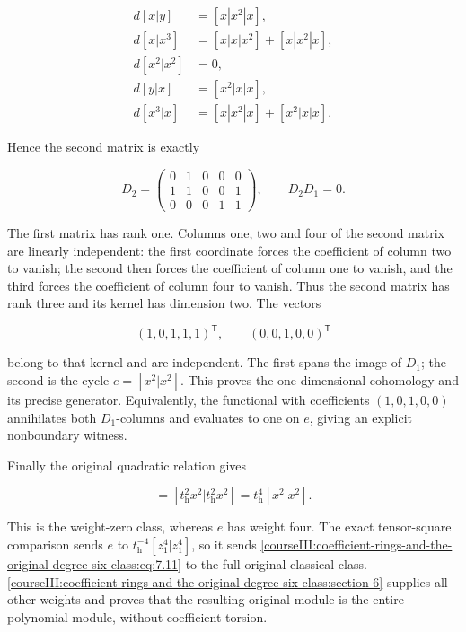 \begin{equation}
\begin{aligned}
 d[x|y]&=[x|x^2|x],\\
 d[x|x^3]&=[x|x|x^2]+[x|x^2|x],\\
 d[x^2|x^2]&=0,\\
 d[y|x]&=[x^2|x|x],\\
 d[x^3|x]&=[x|x^2|x]+[x^2|x|x].
 \end{aligned}
 \label{courseIII:coefficient-rings-and-the-original-degree-six-class:eq:7.8}
\end{equation}

Hence the second matrix is exactly

\begin{equation}
D_2=
 \begin{pmatrix}
 0&1&0&0&0\\
 1&1&0&0&1\\
 0&0&0&1&1
 \end{pmatrix},
 \qquad D_2D_1=0.
 \label{courseIII:coefficient-rings-and-the-original-degree-six-class:eq:7.9}
\end{equation}

The first matrix has rank one. Columns one, two and four of the second matrix are linearly independent: the first coordinate forces the coefficient of column two to vanish; the second then forces the coefficient of column one to vanish, and the third forces the coefficient of column four to vanish. Thus the second matrix has rank three and its kernel has dimension two. The vectors

\begin{equation}
(1,0,1,1,1)^{\mathsf T},
 \qquad
 (0,0,1,0,0)^{\mathsf T}
 \label{courseIII:coefficient-rings-and-the-original-degree-six-class:eq:7.10}
\end{equation}

belong to that kernel and are independent. The first spans the image of \(D_1\); the second is the cycle \(e=[x^2|x^2]\). This proves the one-dimensional cohomology and its precise generator. Equivalently, the functional with coefficients \((1,0,1,0,0)\) annihilates both \(D_1\)-columns and evaluates to one on \(e\), giving an explicit nonboundary witness.

Finally the original quadratic relation gives

\begin{equation}
[\tau_0^4|\tau_0^4]
       =[t_{\mathrm h}^2x^2|t_{\mathrm h}^2x^2]
       =t_{\mathrm h}^4[x^2|x^2].
 \label{courseIII:coefficient-rings-and-the-original-degree-six-class:eq:7.11}
\end{equation}

This is the weight-zero class, whereas \(e\) has weight four. The exact tensor-square comparison sends \(e\) to \(t_{\mathrm h}^{-4}[z_1^4|z_1^4]\), so it sends \eqref{courseIII:coefficient-rings-and-the-original-degree-six-class:eq:7.11} to the full original classical class. \cref{courseIII:coefficient-rings-and-the-original-degree-six-class:section-6} supplies all other weights and proves that the resulting original module is the entire polynomial module, without coefficient torsion.

\label{courseIII:coefficient-rings-and-the-original-degree-six-class:coefficient-source-scope}
